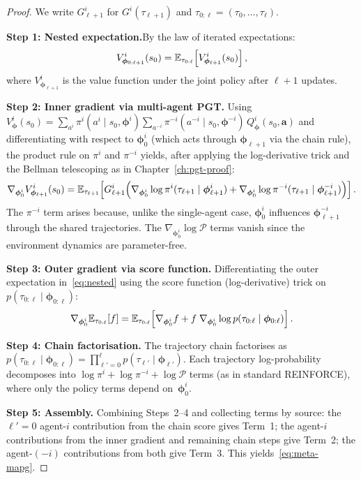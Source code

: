 \begin{proof}
We write $G_{\ell+1}^i$ for $G^i(\tau_{\ell+1})$ and $\tau_{0:\ell}=(\tau_0,\ldots,\tau_\ell)$.

\medskip\noindent\textbf{Step 1: Nested expectation.}\quad By the law of iterated expectations:
\begin{equation}\label{eq:nested}
  V^i_{\bm{\phi}_{0:\ell+1}}(s_0) = \mathbb{E}_{\tau_{0:\ell}}\!\left[V^i_{\bm{\phi}_{\ell+1}}(s_0)\right],
\end{equation}
where $V^i_{\bm{\phi}_{\ell+1}}$ is the value function under the joint policy after $\ell+1$ updates.

\medskip\noindent\textbf{Step 2: Inner gradient via multi-agent PGT.}\quad
Using $V^i_{\bm{\phi}}(s_0) = \sum_{a^i}\pi^i(a^i\mid s_0,\bm{\phi}^i)\sum_{a^{-i}}\pi^{-i}(a^{-i}\mid s_0,\bm{\phi}^{-i})\,Q^i_{\bm{\phi}}(s_0,\bm{a})$ and differentiating with respect to $\bm{\phi}_0^i$ (which acts through $\bm{\phi}_{\ell+1}$ via the chain rule), the product rule on $\pi^i$ and $\pi^{-i}$ yields, after applying the log-derivative trick and the Bellman telescoping as in Chapter~\ref{ch:pgt-proof}:
\begin{equation}\label{eq:inner-grad}
  \nabla_{\bm{\phi}_0^i} V^i_{\bm{\phi}_{\ell+1}}(s_0) = \mathbb{E}_{\tau_{\ell+1}}\!\left[G_{\ell+1}^i\!\left(\nabla_{\bm{\phi}_0^i}\log\pi^i(\tau_{\ell+1}\mid\bm{\phi}_{\ell+1}^i) + \nabla_{\bm{\phi}_0^i}\log\pi^{-i}(\tau_{\ell+1}\mid\bm{\phi}_{\ell+1}^{-i})\right)\right].
\end{equation}
The $\pi^{-i}$ term arises because, unlike the single-agent case, $\bm{\phi}_0^i$ influences $\bm{\phi}_{\ell+1}^{-i}$ through the shared trajectories. The $\nabla_{\bm{\phi}_0^i}\log\mathcal{P}$ terms vanish since the environment dynamics are parameter-free.

\medskip\noindent\textbf{Step 3: Outer gradient via score function.}\quad
Differentiating the outer expectation in~\eqref{eq:nested} using the score function (log-derivative) trick on $p(\tau_{0:\ell}\mid\bm{\phi}_{0:\ell})$:
\begin{equation}\label{eq:outer-score}
  \nabla_{\bm{\phi}_0^i}\mathbb{E}_{\tau_{0:\ell}}[f] = \mathbb{E}_{\tau_{0:\ell}}\!\left[\nabla_{\bm{\phi}_0^i} f + f\;\nabla_{\bm{\phi}_0^i}\log p(\tau_{0:\ell}\mid\bm{\phi}_{0:\ell})\right].
\end{equation}

\medskip\noindent\textbf{Step 4: Chain factorisation.}\quad
The trajectory chain factorises as $p(\tau_{0:\ell}\mid\bm{\phi}_{0:\ell})=\prod_{\ell'=0}^\ell p(\tau_{\ell'}\mid\bm{\phi}_{\ell'})$. Each trajectory log-probability decomposes into $\log\pi^i + \log\pi^{-i} + \log\mathcal{P}$ terms (as in standard REINFORCE), where only the policy terms depend on~$\bm{\phi}_0^i$.

\medskip\noindent\textbf{Step 5: Assembly.}\quad
Combining Steps~2--4 and collecting terms by source: the $\ell'=0$ agent-$i$ contribution from the chain score gives Term~1; the agent-$i$ contributions from the inner gradient and remaining chain steps give Term~2; the agent-$(-i)$ contributions from both give Term~3. This yields~\eqref{eq:meta-mapg}.
\end{proof}

